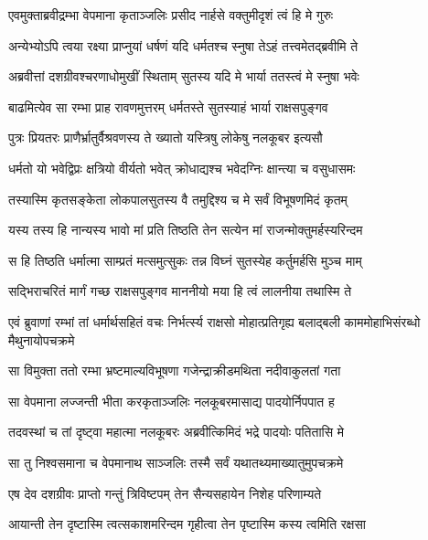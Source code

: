 \twolineshloka
{एवमुक्ताब्रवीद्रम्भा वेपमाना कृताञ्जलिः}
{प्रसीद नार्हसे वक्तुमीदृशं त्वं हि मे गुरुः} %

\twolineshloka
{अन्येभ्योऽपि त्वया रक्ष्या प्राप्नुयां धर्षणं यदि}
{धर्मतश्च स्नुषा तेऽहं तत्त्वमेतद्ब्रवीमि ते} %

\twolineshloka
{अब्रवीत्तां दशग्रीवश्चरणाधोमुखीं स्थिताम्}
{सुतस्य यदि मे भार्या ततस्त्वं मे स्नुषा भवेः} %

\twolineshloka
{बाढमित्येव सा रम्भा प्राह रावणमुत्तरम्}
{धर्मतस्ते सुतस्याहं भार्या राक्षसपुङ्गव} %

\twolineshloka
{पुत्रः प्रियतरः प्राणैर्भ्रातुर्वैश्रवणस्य ते}
{ख्यातो यस्त्रिषु लोकेषु नलकूबर इत्यसौ} %

\twolineshloka
{धर्मतो यो भवेद्विप्रः क्षत्रियो वीर्यतो भवेत्}
{क्रोधाद्यश्च भवेदग्निः क्षान्त्या च वसुधासमः} %

\twolineshloka
{तस्यास्मि कृतसङ्केता लोकपालसुतस्य वै}
{तमुद्दिश्य च मे सर्वं विभूषणमिदं कृतम्} %

\twolineshloka
{यस्य तस्य हि नान्यस्य भावो मां प्रति तिष्ठति}
{तेन सत्येन मां राजन्मोक्तुमर्हस्यरिन्दम} %

\twolineshloka
{स हि तिष्ठति धर्मात्मा साम्प्रतं मत्समुत्सुकः}
{तन्न विघ्नं सुतस्येह कर्तुमर्हसि मुञ्च माम्} %

\twolineshloka
{सद्भिराचरितं मार्गं गच्छ राक्षसपुङ्गव}
{माननीयो मया हि त्वं लालनीया तथास्मि ते} %

\threelineshloka
{एवं ब्रुवाणां रम्भां तां धर्मार्थसहितं वचः}
{निर्भर्त्स्य राक्षसो मोहात्प्रतिगृह्य बलाद्बली}
{काममोहाभिसंरब्धो मैथुनायोपचक्रमे} %

\twolineshloka
{सा विमुक्ता ततो रम्भा भ्रष्टमाल्यविभूषणा}
{गजेन्द्राक्रीडमथिता नदीवाकुलतां गता} %

\twolineshloka
{सा वेपमाना लज्जन्ती भीता करकृताञ्जलिः}
{नलकूबरमासाद्य पादयोर्निपपात ह} %

\twolineshloka
{तदवस्थां च तां दृष्ट्वा महात्मा नलकूबरः}
{अब्रवीत्किमिदं भद्रे पादयोः पतितासि मे} %

\twolineshloka
{सा तु निश्वसमाना च वेपमानाथ साञ्जलिः}
{तस्मै सर्वं यथातथ्यमाख्यातुमुपचक्रमे} %

\twolineshloka
{एष देव दशग्रीवः प्राप्तो गन्तुं त्रिविष्टपम्}
{तेन सैन्यसहायेन निशेह परिणाम्यते} %

\twolineshloka
{आयान्ती तेन दृष्टास्मि त्वत्सकाशमरिन्दम}
{गृहीत्वा तेन पृष्टास्मि कस्य त्वमिति रक्षसा} %

